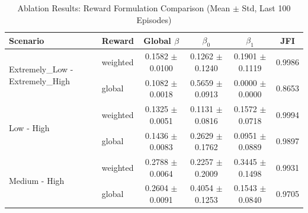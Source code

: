 \begin{table}[!t]
\caption{Ablation Results: Reward Formulation Comparison (Mean $\pm$ Std, Last 100 Episodes)}
\label{tab:ablation_results}
\centering
\begin{tabular}{@{}llcccc@{}}
\toprule
\textbf{Scenario} & \textbf{Reward} & \textbf{Global $\beta$} & \textbf{$\beta_0$} & \textbf{$\beta_1$} & \textbf{JFI} \\
\midrule
\multirow{2}{*}{Extremely_Low - Extremely_High}
  & weighted  & 0.1582 $\pm$ 0.0100 & 0.1262 $\pm$ 0.1240 & 0.1901 $\pm$ 0.1119 & 0.9986 \\
  & global  & 0.1082 $\pm$ 0.0018 & 0.5659 $\pm$ 0.0913 & 0.0000 $\pm$ 0.0000 & 0.8653 \\
\midrule
\multirow{2}{*}{Low - High}
  & weighted  & 0.1325 $\pm$ 0.0051 & 0.1131 $\pm$ 0.0816 & 0.1572 $\pm$ 0.0718 & 0.9994 \\
  & global  & 0.1436 $\pm$ 0.0083 & 0.2629 $\pm$ 0.1762 & 0.0951 $\pm$ 0.0889 & 0.9897 \\
\midrule
\multirow{2}{*}{Medium - High}
  & weighted  & 0.2788 $\pm$ 0.0064 & 0.2257 $\pm$ 0.2009 & 0.3445 $\pm$ 0.1498 & 0.9931 \\
  & global  & 0.2604 $\pm$ 0.0091 & 0.4054 $\pm$ 0.1253 & 0.1543 $\pm$ 0.0840 & 0.9705 \\
\bottomrule
\end{tabular}
\end{table}
